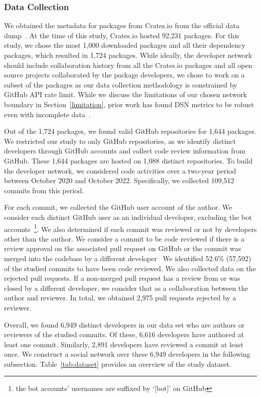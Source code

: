 \documentclass[10pt,journal,compsoc]{IEEEtran}
\begin{document}
\subsubsection{Data Collection}
We obtained the metadata for packages from Crates.io from the official data dump~\cite{cratesio}. At the time of this study, Crates.io hosted 92,231 packages. For this study, we chose the most 1,000 downloaded packages and all their dependency packages, which resulted in 1,724 packages. While ideally, the developer network should include collaboration history from all the Crates.io packages and all open source projects collaborated by the package developers, we chose to work on a subset of the packages as our data collection methodology is constrained by GitHub API rate limit. While we discuss the limitations of our chosen network boundary in Section~\ref{limitation}, prior work has found DSN metrics to be robust even with incomplete data~\cite{nia2010validity}.

Out of the 1,724 packages, we found valid GitHub repositories for 1,644 packages. We restricted our study to only GitHub repositories, as we identify distinct developers through GitHub accounts and collect code review information from GitHub. These 1,644 packages are hosted on 1,088 distinct repositories. To build the developer network, we considered code activities over a two-year period between October 2020 and October 2022. Specifically, we collected 109,512 commits from this period. 

For each commit, we collected the GitHub user account of the author. We consider each distinct GitHub user as an individual developer, excluding the bot accounts~\footnote{the bot accounts' usernames are suffixed by `[bot]' on GitHub}. We also determined if each commit was reviewed or not by developers other than the author. We consider a commit to be code reviewed if there is a review approval on the associated pull request on GitHub or the commit was merged into the codebase by a different developer~\cite{imtiaz2022phantom} We identified 52.6\% (57,592) of the studied commits to have been code reviewed. We also collected data on the rejected pull requests. If a non-merged pull request has a review from or was closed by a different developer, we consider that as a collaboration between the author and reviewer. In total, we obtained 2,975 pull requests rejected by a reviewer.

Overall, we found 6,949 distinct developers in our data set who are authors or reviewers of the studied commits.
Of these,  6,616  developers have authored at least one commit. Similarly, 2,891 developers have reviewed a commit at least once. 
We construct a social network over these 6,949 developers in the following subsection.
Table~\ref{tab:dataset} provides an overview of the study dataset.
\end{document}

